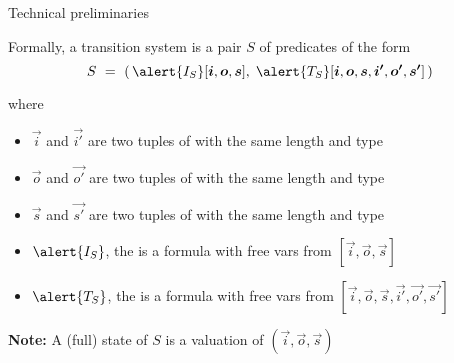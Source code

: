 \documentclass[10pt,aspectratio=149]{beamer}
\begin{document}
%
%


\begin{frame}{Technical preliminaries}

Formally, a transition system is a pair $S$ of predicates of the form
{\large
\[
 S \ = \ (\,
 \alert{I_S}[\vec i,\vec o,\vec s],\;
 \alert{T_S}[\vec i,\vec o,\vec s, \vec{i'},\vec{o'},\vec{s'}]\,
 )
\]
}
\pause

where 
\begin{itemize}
\item 
$\vec i$ and $\vec{i'}$ are two tuples of  with the same length and type
\item 
$\vec o$ and $\vec{o'}$ are two tuples of  with the same length and type
\item 
$\vec s$ and $\vec{s'}$ are two tuples of  with the same length and type
\item 
$\alert{I_S}$, the  is a formula with free vars from $[\vec i,\vec o,\vec s]$ 
\item
$\alert{T_S}$, the  is a formula with free vars from $[\vec i,\vec o,\vec s, \vec{i'},\vec{o'},\vec{s'}]$
\end{itemize}
\bigskip

\pause
\textbf{Note:}
A (full) state of $S$ is a valuation of $(\vec i,\vec o,\vec s)$
\end{frame}
\end{document}
